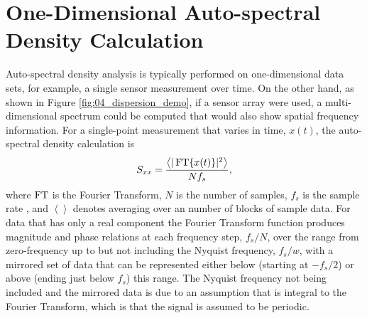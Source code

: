 \section{One-Dimensional Auto-spectral Density Calculation}
Auto-spectral density analysis is typically performed on one-dimensional data sets, for example, a single sensor measurement over time.
On the other hand, as shown in Figure \ref{fig:04_dispersion_demo}, if a sensor array were used, a multi-dimensional spectrum could be computed that would also show spatial frequency information.
For a single-point measurement that varies in time, $x(t)$, the auto-spectral density calculation is
\begin{equation}
 S_{xx} = \frac{\left<|\fft\{x(t)\}|^2\right>}{Nf_{s}} \textrm{,}
 \label{eqn:04_basic_sxx}
\end{equation}
where $\operatorname{FT}$ is the Fourier Transform, $N$ is the number of samples, $f_{s}$ is the sample rate \cite{Blackman-1958-4QtKgDb8}, and $\left<\right>$ denotes averaging over an number of blocks of sample data.
For data that has only a real component the Fourier Transform function produces magnitude and phase relations at each frequency step, $f_{s}/N$, over the range from zero-frequency up to but not including the Nyquist frequency, $f_s/w$, with a mirrored set of data that can be represented either below (starting at $-f_s/2$) or above (ending just below $f_s$) this range.
The Nyquist frequency not being included and the mirrored data is due to an assumption that is integral to the Fourier Transform, which is that the signal is assumed to be periodic.

